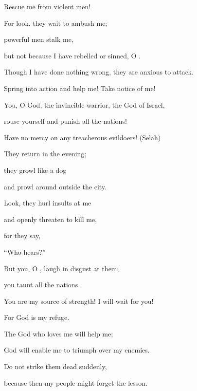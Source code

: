 {\par }{\Q Rescue
me from violent
men!
\par }{\Q {}For
look,
they wait to ambush
me;
\par }{\Q powerful men stalk
me,
\par }{\Q but not
because
I have rebelled
or
sinned,
O
{}.
\par }{\Q {}Though I have done nothing wrong, they
are anxious
to attack.

\par }{\Q Spring
into action
and help
me! Take notice of me!
\par }{\Q {}You,
O
{}
God,
the invincible
warrior, the God
of Israel,
\par }{\Q rouse
yourself and punish
all
the nations!
\par }{\Q Have no
mercy
on any
treacherous
evildoers! (Selah)
\par }{\Q {}They return
in the evening;
\par }{\Q they growl
like a dog
\par }{\Q and prowl around outside
the city.
\par }{\Q {}Look,
they hurl insults
at me
\par }{\Q and openly threaten to kill me,
\par }{\Q for
they say,

\par }{\Q “Who
hears?”
\par }{\Q {}But you,
O
{}, laugh
in disgust at them;

\par }{\Q you taunt
all
the nations.
\par }{\Q {}You are my source
of strength! I will wait for
you!

\par }{\Q For
God
is my refuge.
\par }{\Q {}The God
who loves
me
will help me;
\par }{\Q God
will enable
me to triumph over my enemies.
\par }{\Q {}Do not
strike
them dead suddenly,
\par }{\Q because then
my people
might
forget
the lesson.

}
